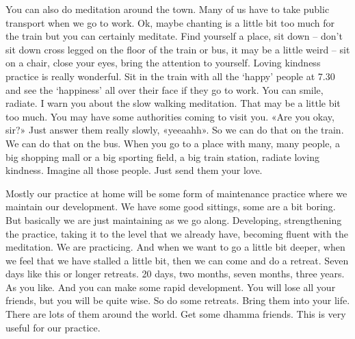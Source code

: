 \documentclass[letterpaper,10pt,english]{sphinxmanual}
\begin{document}
\sphinxAtStartPar
You can also do meditation around the town. Many of us have to take
public transport when we go to work. Ok, maybe chanting is a little bit too
much for the train but you can certainly meditate. Find yourself a place, sit
down – don’t sit down cross legged on the floor of the train or bus, it may be
a little weird – sit on a chair, close your eyes, bring the attention to yourself.
Loving  kindness  practice  is  really  wonderful.  Sit  in  the  train  with  all  the
‘happy’ people at 7.30 and see the ‘happiness’ all over their face if they go to
work. You can smile, radiate. I warn you about the slow walking meditation.
That may be a little bit too much. You may have some authorities coming to
visit you. «Are you okay, sir?» Just answer them really slowly, «yeeaahh».
So we can do that on the train. We can do that on the bus. When you
go to a place with many, many people, a big shopping mall or a big sporting
field, a big train station, radiate loving kindness. Imagine all those people.
Just send them your love.

\sphinxAtStartPar
Mostly our practice at home will be some form of maintenance practice
where we maintain our development. We have some good sittings, some are
a bit boring. But basically we are just maintaining as we go along. Developing, strengthening the practice, taking it to the level that we already have,
becoming fluent with the meditation. We are practicing. And when we want
to go a little bit deeper, when we feel that we have stalled a little bit, then we
  can come and do a retreat. Seven days like this or longer retreats. 20 days,
two months, seven months, three years. As you like. And you can make some
rapid development. You will lose all your friends, but you will be quite wise.
So do some retreats. Bring them into your life. There are lots of them around
the world. Get some dhamma friends. This is very useful for our practice.
\end{document}
